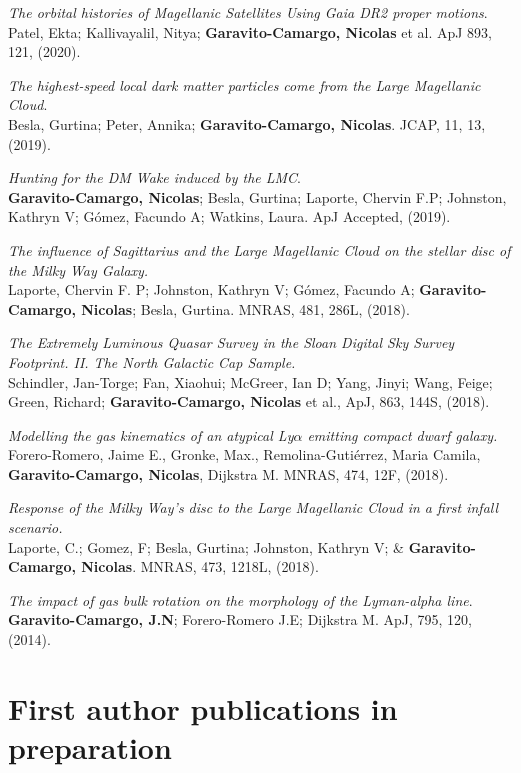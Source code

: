 \documentclass[UTF8]{article}
\begin{document}
\begin{etaremune}
\item \textit{The orbital histories of Magellanic Satellites Using Gaia DR2
  proper motions}. \\
  Patel, Ekta; Kallivayalil, Nitya; \textbf{Garavito-Camargo, Nicolas} et al.
  ApJ 893, 121, (2020).
\item \textit{The highest-speed local dark matter particles come from the Large
  Magellanic Cloud}. \\
  Besla, Gurtina; Peter, Annika; \textbf{Garavito-Camargo, Nicolas}. JCAP, 11,
  13, (2019).
\item \textit{Hunting for the DM Wake induced by the LMC}.\\
  \textbf{Garavito-Camargo, Nicolas}; Besla, Gurtina; Laporte, Chervin F.P;
  Johnston, Kathryn V; G\'omez, Facundo A; Watkins, Laura. ApJ Accepted, (2019).
\item \textit{The influence of Sagittarius and the Large Magellanic Cloud on the
  stellar disc of the Milky Way Galaxy.}\\
  Laporte, Chervin F. P; Johnston, Kathryn V; G\'omez, Facundo A; \textbf{Garavito-Camargo, Nicolas}; Besla,
  Gurtina. MNRAS, 481, 286L, (2018).
\item \textit{The Extremely Luminous Quasar Survey in the Sloan Digital Sky
  Survey Footprint. II. The North Galactic Cap Sample.}\\ Schindler, Jan-Torge;
  Fan, Xiaohui; McGreer, Ian D; Yang, Jinyi; Wang, Feige; Green, Richard;
  \textbf{Garavito-Camargo, Nicolas} et al., ApJ, 863, 144S, (2018).
\item \textit{Modelling the gas kinematics of an atypical Ly$\alpha$
emitting compact dwarf galaxy.}\\  Forero-Romero, Jaime E., Gronke, Max.,
Remolina-Gutiérrez, Maria Camila, \textbf{Garavito-Camargo, Nicolas}, Dijkstra
M. MNRAS, 474, 12F, (2018).
\item \textit{Response of the Milky Way's disc to the Large Magellanic Cloud in
  a first infall scenario.}\\ Laporte, C.; Gomez, F; Besla, Gurtina; Johnston,
  Kathryn V; \& \textbf{Garavito-Camargo, Nicolas}. MNRAS, 473, 1218L, (2018).
 \item \textit{The impact of gas bulk rotation on the morphology of the
   Lyman-alpha line}.\\ \textbf{Garavito-Camargo, J.N}; Forero-Romero J.E;
   Dijkstra M. ApJ, 795, 120, (2014).
\end{etaremune}


\section*{First author publications in preparation}
\end{document}
